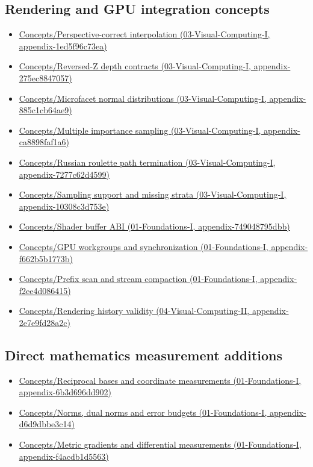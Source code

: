 \subsection{Rendering and GPU integration concepts}\label{rendering-and-gpu-integration-concepts}

\begin{itemize}
\tightlist
\item
  \href{}{Concepts/Perspective-correct interpolation (03-Visual-Computing-I, appendix-1ed5f96c73ea)}
\item
  \href{}{Concepts/Reversed-Z depth contracts (03-Visual-Computing-I, appendix-275ec8847057)}
\item
  \href{}{Concepts/Microfacet normal distributions (03-Visual-Computing-I, appendix-885c1cb64ae9)}
\item
  \href{}{Concepts/Multiple importance sampling (03-Visual-Computing-I, appendix-ca8898faf1a6)}
\item
  \href{}{Concepts/Russian roulette path termination (03-Visual-Computing-I, appendix-7277c62d4599)}
\item
  \href{}{Concepts/Sampling support and missing strata (03-Visual-Computing-I, appendix-10308c3d753e)}
\item
  \href{}{Concepts/Shader buffer ABI (01-Foundations-I, appendix-749048795dbb)}
\item
  \href{}{Concepts/GPU workgroups and synchronization (01-Foundations-I, appendix-f662b5b1773b)}
\item
  \href{}{Concepts/Prefix scan and stream compaction (01-Foundations-I, appendix-f2ee4d086415)}
\item
  \href{}{Concepts/Rendering history validity (04-Visual-Computing-II, appendix-2e7e9fd28a2c)}
\end{itemize}

\subsection{Direct mathematics measurement additions}\label{direct-mathematics-measurement-additions}

\begin{itemize}
\tightlist
\item
  \href{}{Concepts/Reciprocal bases and coordinate measurements (01-Foundations-I, appendix-6b3d696dd902)}
\item
  \href{}{Concepts/Norms, dual norms and error budgets (01-Foundations-I, appendix-d6d9dbbe3c14)}
\item
  \href{}{Concepts/Metric gradients and differential measurements (01-Foundations-I, appendix-f4acdb1d5563)}
\end{itemize}

